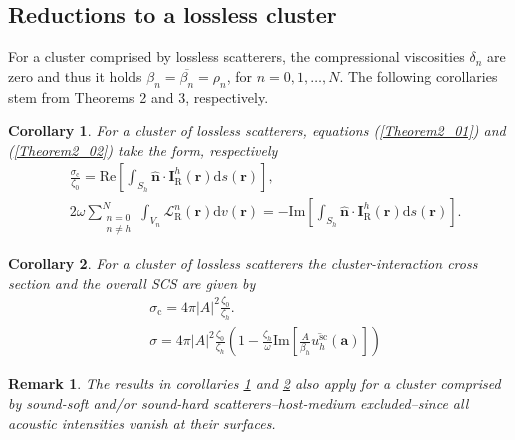 \documentclass{article}
\newtheorem{corollary}{Corollary}
\newtheorem{remark}{Remark}
\begin{document}
\subsection{Reductions to a lossless cluster}
%
For a cluster comprised by lossless scatterers, the compressional viscosities $\delta_n$ are zero and thus it holds $\beta_n=\overline{\beta_n}=\rho_n$, for $n=0,1,\ldots,N$. The following corollaries stem from Theorems 2 and 3, respectively.
%
\begin{corollary}\label{corol1}
For a cluster of lossless scatterers, equations (\ref{Theorem2_01}) and (\ref{Theorem2_02}) take the form, respectively
\begin{align}
   \label{Corollary1_01}
       &\frac{\sigma_\mathrm{c}}{\zeta_0}=\mathrm{Re}\left[\int_{S_h}\hat{\mathbf{n}}\cdot\mathbf{I}_{\mathrm{R}}^{h}(\mathbf{r})\mathrm{d}s(\mathbf{r})\right], \\
       \label{Corollary1_02}
        &2\omega\sum_{\substack{n=0\\n\ne h}}^{N}\int_{V_n}\mathcal{L}_{\mathrm{R}}^n(\mathbf{r})\mathrm{d}v(\mathbf{r})=-\mathrm{Im}\left[\int_{S_h}\hat{\mathbf{n}}\cdot\mathbf{I}_{\mathrm{R}}^{h}(\mathbf{r})\mathrm{d}s(\mathbf{r})\right].
        \end{align}
\end{corollary}
%
\begin{corollary}\label{corol3}
    For a cluster of lossless scatterers the cluster-interaction cross section and the overall SCS are given by
    \begin{align}
    \label{Theorem6_01}
    &\sigma_\mathrm{c}=4\pi\lvert A\rvert^2\frac{\zeta_0}{\zeta_h}.
\\
\label{OSCS}
    &\sigma=4\pi\lvert A\rvert^2\frac{\zeta_0}{\zeta_h}\left(1-\frac{\zeta_h}{\omega}\mathrm{Im}\left[\frac{A}{\beta_h}\overline{u_h^{\mathrm{sc}}}(\mathbf{a})\right]\right)
\end{align}
\end{corollary}
%
% 
%
\begin{remark}
    The results in corollaries \ref{corol1} and \ref{corol3} also apply for a cluster comprised by sound-soft and/or sound-hard scatterers--host-medium excluded--since all acoustic intensities vanish at their surfaces.
\end{remark}
\end{document}
